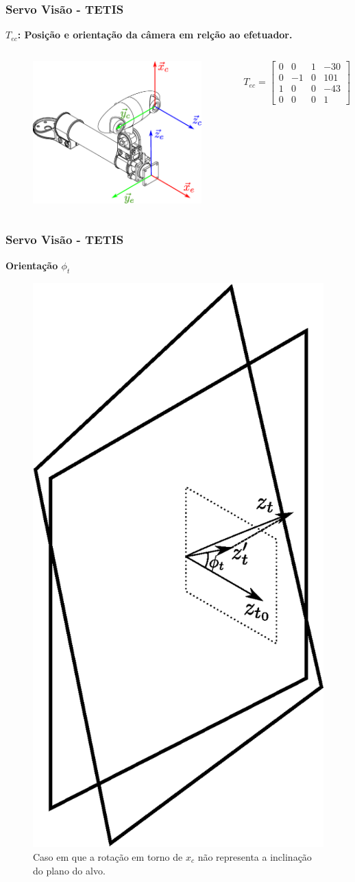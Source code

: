 \documentclass{beamer}
\newcommand\m[1]{\begin{bmatrix}#1\end{bmatrix}}
\begin{document}
\begin{frame}
\frametitle{Servo Visão - TETIS}
\textbf{$T_{ec}$: Posição e orientação da câmera em relção ao efetuador.}
\begin{columns}[c]
\begin{figure}
\includegraphics[width=\linewidth]{./img/effector_camera.eps}
\end{figure}

\begin{equation} \label{eq:tec}
{T}_{ec} = \m{
	0 & 0 & 1 & -30 \\
	0 & -1 & 0 & 101 \\
	1 &  0 & 0 & -43 \\
	0 &  0 & 0 &  1
}
\end{equation}
\end{columns}
\end{frame}

\begin{frame}
\frametitle{Servo Visão - TETIS}
\textbf{Orientação $\phi_t$}
\begin{figure}[!ht]
\centering
  \includegraphics[width=0.2\linewidth]{./img/projection.eps}
  \caption{Caso em que a rotação em torno de ${x}_c$ não representa a inclinação do plano do alvo.}
  \label{fig:projection}
\end{figure}%
\end{frame}
\end{document}
